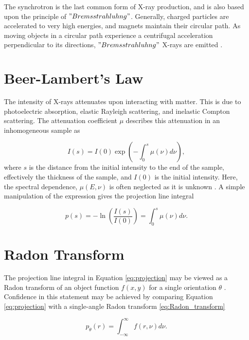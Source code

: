 The synchrotron is the last common form of X-ray production, and is also based upon the principle of $"Bremsstrahluhng"$.
Generally, charged particles are accelerated to very high energies, and magnets maintain their circular path.
As moving objects in a circular path experience a centrifugal acceleration perpendicular to its directions, $"Bremsstrahluhng"$ X-rays are emitted \cite{britannica_sync}.


\section{Beer-Lambert's Law}
The intensity of X-rays attenuates upon interacting with matter.
This is due to photoelectric absorption, elastic Rayleigh scattering, and inelastic Compton scattering.
The attenuation coefficient $\mu$ describes this attenuation in an inhomogeneous sample as

\begin{equation}
    I(s) = I(0) \exp(- \int_{0}^{s} \mu(\nu) d\nu),
\end{equation}
\noindent
where $s$ is the distance from the initial intensity to the end of the sample, effectively the thickness of the sample, and $I(0)$ is the initial intensity. Here, the spectral dependence, $\mu(E,\nu)$ is often neglected as it is unknown \cite{buzug2009computed}. A simple manipulation of the expression gives the projection line integral

\begin{equation}\label{eq:projection}
    p(s) = -\ln(\frac{I(s)}{I(0)} ) = \int_{0}^{s} \mu(\nu) d\nu.
\end{equation}

\section{Radon Transform}
The projection line integral in Equation \eqref{eq:projection} may be viewed as a Radon transform of an object function $f(x,y)$ for a single orientation $\theta$ \cite{zeng2010medical}.
Confidence in this statement may be achieved by comparing Equation \eqref{eq:projection} with a single-angle Radon transform \eqref{eq:Radon_transform}

\begin{equation}\label{eq:Radon_transform}
    p_{\theta}(r) = \int_{-\infty}^{\infty} f(r,\nu) d\nu.
\end{equation}

